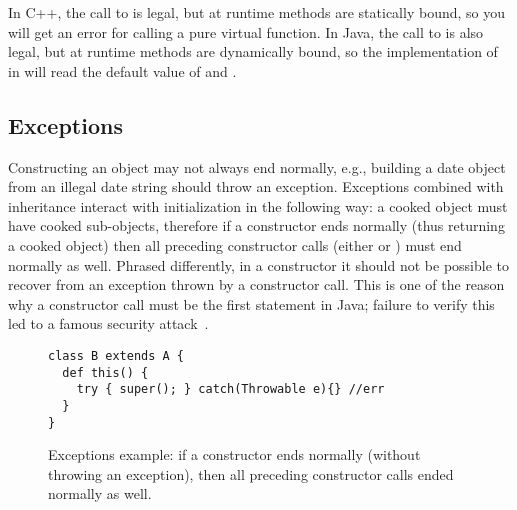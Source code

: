 In C++, the call to  is legal,
    but at runtime
    methods are statically bound,
    so you will get an error for calling a pure virtual function.
In Java, the call to  is also legal,
    but at runtime
    methods are dynamically bound,
    so the implementation of  in 
    will read the default value of  and .




\subsection{Exceptions}
Constructing an object may not always end normally,
    e.g., building a date object from an illegal date string should throw an exception.
Exceptions combined with inheritance interact with initialization in the following way:
    a cooked object must have cooked sub-objects,
    therefore if a constructor ends normally (thus returning a cooked object)
    then all preceding constructor calls (either  or )
    must end normally as well.
Phrased differently, in a constructor it should not be possible to
    recover from an exception thrown by a constructor call.
This is one of the reason why a constructor call must be the first statement in Java;
    failure to verify this led to a famous security attack~\cite{Dean:1996}.

\begin{figure}
\begin{lstlisting}
class B extends A {
  def this() {
    try { super(); } catch(Throwable e){} //err
  }
}
\end{lstlisting}
\caption{Exceptions example:
    if a constructor ends normally (without throwing an exception),
        then all preceding constructor calls ended normally as well.
    }
\label{Figure:Exceptions}
\end{figure}


